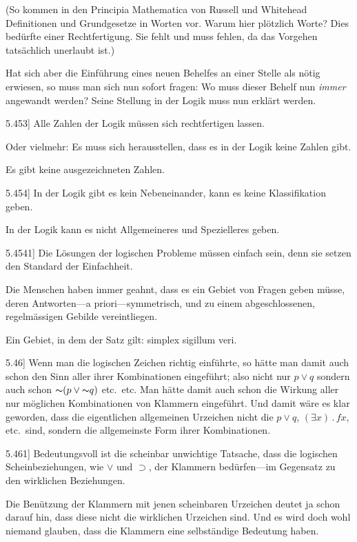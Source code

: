 \documentclass[12pt,oneside]{book}[2007/10/19]
\newcommand{\PropERef}[1]{\hyperref[PropE:#1]{#1}}
\newcommand{\PropositionG}[2]{%
  \item[\phantomsection\label{PropG:#1}\PropERef{#1}] #2%
}
\newcommand{\Not}[1]{\mathord{\thicksim} #1}
\newcommand{\DotOp}{\mathbin{.}}
\newcommand{\Implies}{\supset}
\newcommand{\Emph}[1]{\emph{#1}}%
\begin{document}
\begin{propositions}
{(So kommen in den \glqq{}Principia Mathematica\grqq{}
von Russell und Whitehead Definitionen und
Grundgesetze in Worten vor. Warum hier plötzlich
Worte? Dies bedürfte einer Rechtfertigung.
Sie fehlt und muss fehlen, da das Vorgehen tatsächlich
unerlaubt ist.)

Hat sich aber die Einführung eines neuen
Behelfes an einer Stelle als nötig erwiesen, so muss
man sich nun sofort fragen: Wo muss dieser
Behelf nun \Emph{immer} angewandt werden? Seine
Stellung in der Logik muss nun erklärt werden.}


\PropositionG{5.453}
{Alle Zahlen der Logik müssen sich rechtfertigen
lassen.

Oder vielmehr: Es muss sich herausstellen,
dass es in der Logik keine Zahlen gibt.

Es gibt keine ausgezeichneten Zahlen.}


\PropositionG{5.454}
{In der Logik gibt es kein Nebeneinander, kann
es keine Klassifikation geben.

In der Logik kann es nicht Allgemeineres und
Spezielleres geben.}


\PropositionG{5.4541}
{Die Lösungen der logischen Probleme müssen
einfach sein, denn sie setzen den Standard der
Einfachheit.

Die Menschen haben immer geahnt, dass es ein
Gebiet von Fragen geben müsse, deren Antworten---a
priori---symmetrisch, und zu einem abgeschlossenen,
regelmässigen Gebilde vereintliegen.

Ein Gebiet, in dem der Satz gilt: simplex
sigillum veri.}


\PropositionG{5.46}
{Wenn man die logischen Zeichen richtig
einführte, so hätte man damit auch schon den Sinn
aller ihrer Kombinationen eingeführt; also nicht
nur \glqq{}$p \lor q$\grqq{} sondern auch schon \glqq{}$\Not{(p \lor \Not{q})}$\grqq{} etc.\ etc.
Man hätte damit auch schon die Wirkung
aller nur möglichen Kombinationen von Klammern
eingeführt. Und damit wäre es klar geworden,
dass die eigentlichen allgemeinen Urzeichen nicht
die \glqq{}$p \lor q$\grqq{}, \glqq{}$(\exists x) \DotOp fx$\grqq{}, etc.\ sind, sondern die allgemeinste
Form ihrer Kombinationen.}


\PropositionG{5.461}
{Bedeutungsvoll ist die scheinbar unwichtige
Tatsache, dass die logischen Scheinbeziehungen,
wie $\lor$ und $\Implies$, der Klammern be\-dür\-fen---im Gegensatz
zu den wirklichen Beziehungen.

Die Benützung der Klammern mit jenen scheinbaren
Urzeichen deutet ja schon darauf hin, dass
diese nicht die wirklichen Urzeichen sind. Und
es wird doch wohl niemand glauben, dass die
Klammern eine selbständige Bedeutung haben.}



\end{propositions}
\end{document}
